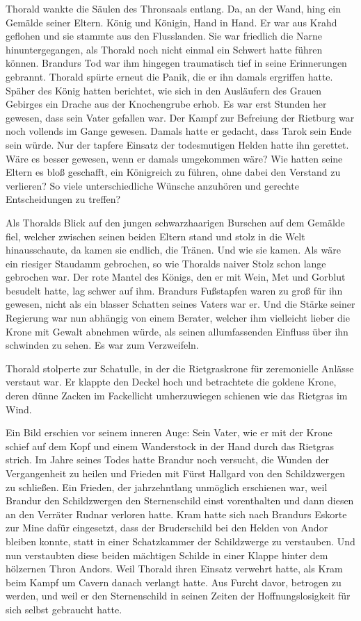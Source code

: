 \documentclass[10pt, a4paper, oneside]{book}
\begin{document}
Thorald wankte die Säulen des Thronsaals entlang. Da, an der Wand, hing ein Gemälde seiner Eltern. König und Königin, Hand in Hand. Er war aus Krahd geflohen und sie stammte aus den Flusslanden. Sie war friedlich die Narne hinuntergegangen, als Thorald noch nicht einmal ein Schwert hatte führen können. Brandurs Tod war ihm hingegen traumatisch tief in seine Erinnerungen gebrannt. Thorald spürte erneut die Panik, die er ihn damals ergriffen hatte. Späher des König hatten berichtet, wie sich in den Ausläufern des Grauen Gebirges ein Drache aus der Knochengrube erhob. Es war erst Stunden her gewesen, dass sein Vater gefallen war. Der Kampf zur Befreiung der Rietburg war noch vollends im Gange gewesen. Damals hatte er gedacht, dass Tarok sein Ende sein würde. Nur der tapfere Einsatz der todesmutigen Helden hatte ihn gerettet. Wäre es besser gewesen, wenn er damals umgekommen wäre? Wie hatten seine Eltern es bloß geschafft, ein Königreich zu führen, ohne dabei den Verstand zu verlieren? So viele unterschiedliche Wünsche anzuhören und gerechte Entscheidungen zu treffen?

Als Thoralds Blick auf den jungen schwarzhaarigen Burschen auf dem Gemälde fiel, welcher zwischen seinen beiden Eltern stand und stolz in die Welt hinausschaute, da kamen sie endlich, die Tränen. Und wie sie kamen. Als wäre ein riesiger Staudamm gebrochen, so wie Thoralds naiver Stolz schon lange gebrochen war. Der rote Mantel des Königs, den er mit Wein, Met und Gorblut besudelt hatte, lag schwer auf ihm. Brandurs Fußstapfen waren zu groß für ihn gewesen, nicht als ein blasser Schatten seines Vaters war er. Und die Stärke seiner Regierung war nun abhängig von einem Berater, welcher ihm vielleicht lieber die Krone mit Gewalt abnehmen würde, als seinen allumfassenden Einfluss über ihn schwinden zu sehen. Es war zum Verzweifeln.

Thorald stolperte zur Schatulle, in der die Rietgraskrone für zeremonielle Anlässe verstaut war. Er klappte den Deckel hoch und betrachtete die goldene Krone, deren dünne Zacken im Fackellicht umherzuwiegen schienen wie das Rietgras im Wind.

Ein Bild erschien vor seinem inneren Auge: Sein Vater, wie er mit der Krone schief auf dem Kopf und einem Wanderstock in der Hand durch das Rietgras strich. Im Jahre seines Todes hatte Brandur noch versucht, die Wunden der Vergangenheit zu heilen und Frieden mit Fürst Hallgard von den Schildzwergen zu schließen. Ein Frieden, der jahrzehntlang unmöglich erschienen war, weil Brandur den Schildzwergen den Sternenschild einst vorenthalten und dann diesen an den Verräter Rudnar verloren hatte. Kram hatte sich nach Brandurs Eskorte zur Mine dafür eingesetzt, dass der Bruderschild bei den Helden von Andor bleiben konnte, statt in einer Schatzkammer der Schildzwerge zu verstauben. Und nun verstaubten diese beiden mächtigen Schilde in einer Klappe hinter dem hölzernen Thron Andors. Weil Thorald ihren Einsatz verwehrt hatte, als Kram beim Kampf um Cavern danach verlangt hatte. Aus Furcht davor, betrogen zu werden, und weil er den Sternenschild in seinen Zeiten der Hoffnungslosigkeit für sich selbst gebraucht hatte.
\end{document}
